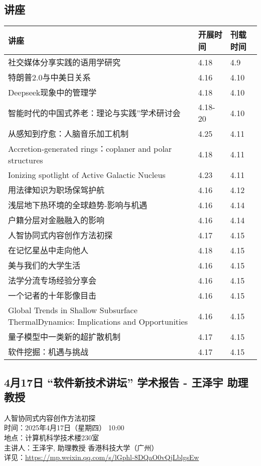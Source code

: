 \documentclass[letterpaper, 12pt]{article}
\begin{document}
\begin{multicols}{2}
\pagebreak

\section{讲座}
\begin{tabular}{|>{\centering\arraybackslash}m{}|m{}|m{}|}
    \hline
    讲座 & 开展时间 & 刊载时间\\
    \hline\hline
    社交媒体分享实践的语用学研究 & 4.18 & 4.9\\\hline
    特朗普2.0与中美日关系 & 4.16 & 4.10\\\hline
    Deepseek现象中的管理学 & 4.18 & 4.10\\\hline
    智能时代的中国式养老：理论与实践”学术研讨会 & 4.18-20 & 4.10\\\hline
    从感知到疗愈：人脑音乐加工机制 & 4.25 & 4.11\\\hline
    Accretion-generated rings：coplaner and polar structures & 4.18 & 4.11\\\hline
    Ionizing spotlight of Active Galactic Nucleus & 4.23 & 4.11\\\hline
    用法律知识为职场保驾护航 & 4.16 & 4.12\\\hline
    浅层地下热环境的全球趋势-影响与机遇 & 4.16 & 4.14\\\hline
    户籍分层对金融融入的影响 & 4.16 & 4.14\\\hline 
    人智协同式内容创作方法初探 & 4.17 & 4.15\\\hline
    在记忆星丛中走向他人 & 4.18 & 4.15\\\hline
    美与我们的大学生活 & 4.16 & 4.15\\\hline
    法学分流专场经验分享会 & 4.16 & 4.15\\\hline
    一个记者的十年影像目击 & 4.16 & 4.15\\\hline
    Global Trends in Shallow Subsurface ThermalDynamics: Implications and Opportunities & 4.16 & 4.15\\\hline
    量子模型中一类新的超扩散机制 & 4.17 & 4.15\\\hline
    软件挖掘：机遇与挑战 & 4.17 & 4.15\\\hline
\end{tabular}
\subsection{4月17日 “软件新技术讲坛” 学术报告 - 王泽宇 助理教授}
人智协同式内容创作方法初探
\\时间：2025年4月17日（星期四） 10:00
\\地点：计算机科学技术楼230室
\\主讲人：王泽宇, 助理教授 香港科技大学（广州）
\\详见：\url{https://mp.weixin.qq.com/s/lGphl-8DQaO0vQjLblgsEw}


\end{multicols}
\end{document}
